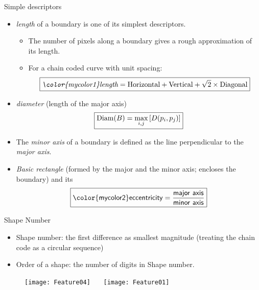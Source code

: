 \begin{frame}{Simple descriptors}
\vspace{-4pt}
\begin{itemize}
\item \textit{\color{mycolor1}length} of a boundary is one of its simplest descriptors.
\begin{itemize}
\item The number of pixels along a boundary gives a rough approximation of its length.
\item For a chain coded curve with unit spacing:
\[\boxed{\textit{\color{mycolor1}length} ={\rm Horizontal}+{\rm Vertical}+\sqrt{2}\times {\rm Diagonal}}\]
\end{itemize}
\item \textit{\color{mycolor1}diameter} (length of the major axis)
\[\boxed{{\rm Diam}(B)=\max_{i,j}{[D(p_i,p_j)]}}\]
\item The \textit{\color{mycolor1}minor axis} of a boundary is defined as the 
line perpendicular to the \textit{\color{mycolor1}major axis}.
\item \textit{\color{mycolor1}Basic rectangle} (formed by the major and the minor axis; 
encloses the boundary) and its
\[\boxed{{\sf \color{mycolor2} eccentricity}=\frac{\it \sf major~axis}{\it \sf minor~axis}}\]
\end{itemize}
\end{frame}

\begin{frame}{Shape Number}
\begin{itemize}
\item {\color{mycolor1}Shape number:} the first difference as {\color{mycolor2}smallest magnitude} (treating the chain code as a circular sequence)
\item {\color{mycolor1}Order of a shape:} the number of digits in Shape number.
\end{itemize}
\vspace{-0.5cm}
\begin{figure}
\texttt{[image: Feature04]}~~~
\texttt{[image: Feature01]}
\end{figure}
\end{frame}

